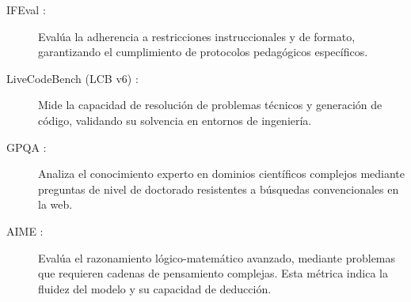 \begin{description}
    \item[IFEval \cite{zhou2023ifeval}:] Evalúa la adherencia a restricciones instruccionales y de formato, garantizando el cumplimiento de protocolos pedagógicos específicos.
    
    \item[LiveCodeBench (LCB v6) \cite{jain2024livecodebench}:] Mide la capacidad de resolución de problemas técnicos y generación de código, validando su solvencia en entornos de ingeniería.
    
    \item[GPQA \cite{rein2023gpqa}:] Analiza el conocimiento experto en dominios científicos complejos mediante preguntas de nivel de doctorado resistentes a búsquedas convencionales en la web.
    
    \item[AIME \cite{dekoninck2026matharena}:] Evalúa el razonamiento lógico-matemático avanzado, mediante problemas que requieren cadenas de pensamiento complejas. Esta métrica indica la fluidez del modelo y su capacidad de deducción.

\end{description}

